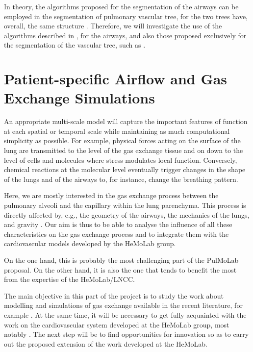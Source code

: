 \approach

In theory, the algorithms proposed for the segmentation of the airways can be employed in the segmentation of pulmonary vascular tree, for the two trees have, overall, the same structure \citep{TawhaiM2011}. Therefore, we will investigate the use of the algorithms described in \citep{Lo}, for the airways, and also those proposed exclusively for the segmentation of the vascular tree, such as \citep{Dongen,Ebrahimdoost,Gutierrez,Linguraru,Shikata,Wala}.


\section{Patient-specific Airflow and Gas Exchange Simulations}

\challenge

An appropriate multi-scale model will capture the important features of function at each spatial or temporal scale while maintaining as much computational simplicity as possible. For example, physical forces acting on the surface of the lung are transmitted to the level of the gas exchange tissue and on down to the level of cells and molecules where stress modulates local function. Conversely, chemical reactions at the molecular level eventually trigger changes in the shape of the lungs and of the airways to, for instance, change the breathing pattern.

Here, we are mostly interested in the gas exchange process between the pulmonary alveoli and the capillary within the lung parenchyma. This process is directly affected by, e.g., the geometry of the airways, the mechanics of the lungs, and gravity  \citep{Tawhai2010}. Our aim is thus to be able to analyse the influence of all these characteristics on the gas exchange process and to integrate them with the cardiovascular models developed by the HeMoLab group.

On the one hand, this is probably the most challenging part of the PulMoLab proposal. On the other hand, it is also the one that tends to benefit the most from the expertise of the HeMoLab/LNCC. 

\approach

The main objective in this part of the project is to study the work about modelling and simulations of gas exchange available in the recent literature, for example \citep{TawhaiM2011,Tawhai2010,Tawhai08,Burrowes2005,Lin2009,Werner2009,DeBacker2008,DeBacker2010,Gemci2007}. At the same time, it will be necessary to get fully acquainted with the work on the cardiovascular system developed at the HeMoLab group, most notably \citep{Blanco2007,Blanco2009a,Blanco2010,Blanco2012,Urquiza2006}. The next step will be to find opportunities for innovation so as to carry out the proposed extension of the work developed at the HeMoLab.

